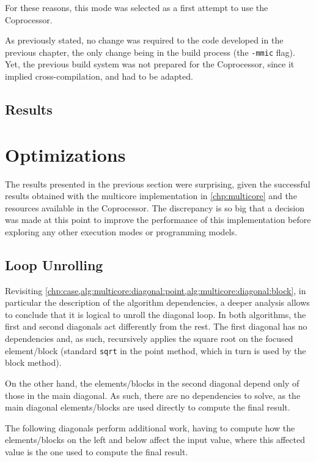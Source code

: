 \documentclass[../thesis]{subfiles}
\begin{document}
	For these reasons, this mode was selected as a first attempt to use the \intel\xeonphi Coprocessor.

	As previously stated, no change was required to the code developed in the previous chapter, the only change being in the build process (the \texttt{-mmic} flag). Yet, the previous build system was not prepared for the \intel\xeonphi Coprocessor, since it implied cross-compilation, and had to be adapted.

	\subsection{Results}

	\section{Optimizations}
	\label{sec:mic:optims}
		The results presented in the previous section were surprising, given the successful results obtained with the multicore implementation in \cref{chp:multicore} and the resources available in the \intel\xeonphi Coprocessor. The discrepancy is so big that a decision was made at this point to improve the performance of this implementation before exploring any other execution modes or programming models.

		\subsection{Loop Unrolling}
		Revisiting \cref{chp:case,alg:multicore:diagonal:point,alg:multicore:diagonal:block}, in particular the description of the algorithm dependencies, a deeper analysis allows to conclude that it is logical to unroll the diagonal loop. In both algorithms, the first and second diagonals act differently from the rest. The first diagonal has no dependencies and, as such, recursively applies the square root on the focused element/block (standard \texttt{sqrt} in the point method, which in turn is used by the block method).

		On the other hand, the elements/blocks in the second diagonal depend only of those in the main diagonal. As such, there are no dependencies to solve, as the main diagonal elements/blocks are used directly to compute the final result.

		The following diagonals perform additional work, having to compute how the elements/blocks on the left and below affect the input value, where this affected value is the one used to compute the final result.
\end{document}
